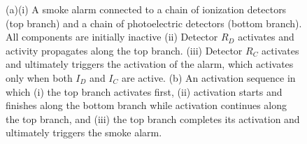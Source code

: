 \documentclass[10pt,letterpaper]{article}
\newcommand{\ev}[2]{$#1_#2$}
\begin{document}
\begin{figure}
\begin{center}
{}
\hfill\null
\end{center}
\caption{(a)(i) A smoke alarm connected to a chain of ionization detectors (top branch) and a chain of photoelectric detectors (bottom branch). All components are initially inactive (ii) Detector \ev{R}{D} activates and activity propagates along the top branch. (iii) Detector \ev{R}{C} activates and ultimately triggers the activation of the alarm, which activates only when both  \ev{I}{D} and \ev{I}{C} are active. (b) An activation sequence in which (i) the top branch activates first, (ii) activation starts and finishes along the bottom branch while activation continues along the top branch, and (iii) the top branch completes its activation and ultimately triggers the smoke alarm.}
\label{fig:intro}
\end{figure}


\end{document}
